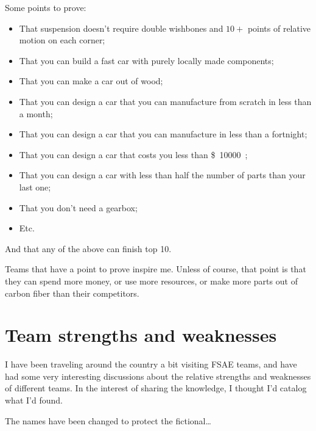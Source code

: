 \documentclass[10pt, a4paper, article, oneside, twocolumn, final]{memoir}
\begin{document}
Some points to prove: 

\begin{itemize}
    \item That suspension doesn’t require double wishbones and $\num{10}+$ points of relative motion on each corner; 
    \item That you can build a fast car with purely locally made components; 
    \item That you can make a car out of wood; 
    \item That you can design a car that you can manufacture from scratch in less than a month;
    \item That you can design a car that you can manufacture in less than a fortnight; 
    \item That you can design a car that costs you less than \SI{10000}[\$]; 
    \item That you can design a car with less than half the number of parts than your last one; 
    \item That you don’t need a gearbox;
    \item Etc.
\end{itemize}

And that any of the above can finish top 10.

Teams that have a point to prove inspire me. Unless of course, that point is that they can spend more money, or use more resources, or make more parts out of carbon fiber than their competitors. 



\chapter*{Team strengths and weaknesses}

I have been traveling around the country a bit visiting FSAE teams, and have had some very interesting discussions about the relative strengths and weaknesses of different teams. In the interest of sharing the knowledge, I thought I’d catalog what I’d found. 

The names have been changed to protect the fictional\ldots
\end{document}
